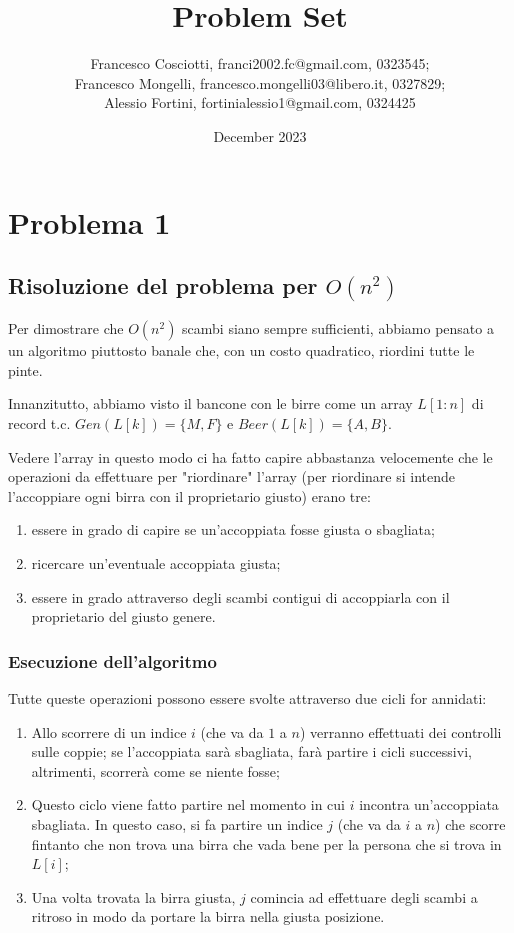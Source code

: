 \documentclass{article}
\title{Problem Set}
\author{Francesco Cosciotti, franci2002.fc@gmail.com, 0323545; 
	\\Francesco Mongelli, francesco.mongelli03@libero.it, 0327829;
	\\ Alessio Fortini, fortinialessio1@gmail.com, 0324425}
\date{December 2023}
\begin{document}
	\maketitle
	
\section{Problema 1}
\subsection{Risoluzione del problema per $O(n^2)$}

Per dimostrare che $O(n^2)$ scambi siano sempre sufficienti, abbiamo pensato a un algoritmo piuttosto banale che, con un costo quadratico, riordini tutte le pinte.

Innanzitutto, abbiamo visto il bancone con le birre come un array $L[1:n]$ di record t.c. $Gen(L[k]) = \{M, F\}$ e $Beer(L[k]) = \{A, B\}$.

Vedere l'array in questo modo ci ha fatto capire abbastanza velocemente che le operazioni da effettuare per "riordinare" l'array (per riordinare si intende l'accoppiare ogni birra con il proprietario giusto) erano tre:
\begin{enumerate}
	\item essere in grado di capire se un'accoppiata fosse giusta o sbagliata;
	\item ricercare un'eventuale accoppiata giusta;
	\item essere in grado attraverso degli scambi contigui di accoppiarla con il proprietario del giusto genere.
\end{enumerate}

\subsubsection{Esecuzione dell'algoritmo}

Tutte queste operazioni possono essere svolte attraverso due cicli for annidati:
\begin{enumerate}
	\item Allo scorrere di un indice $i$ (che va da $1$ a $n$) verranno effettuati dei controlli sulle coppie; se l'accoppiata sarà sbagliata, farà partire i cicli successivi, altrimenti, scorrerà come se niente fosse;
	\item Questo ciclo viene fatto partire nel momento in cui $i$ incontra un'accoppiata sbagliata. In questo caso, si fa partire un indice $j$ (che va da $i$ a $n$) che scorre fintanto che non trova una birra che vada bene per la persona che si trova in $L[i]$;
	\item Una volta trovata la birra giusta, $j$ comincia ad effettuare degli scambi a ritroso in modo da portare la birra nella giusta posizione.
\end{enumerate}
	
\end{document}

